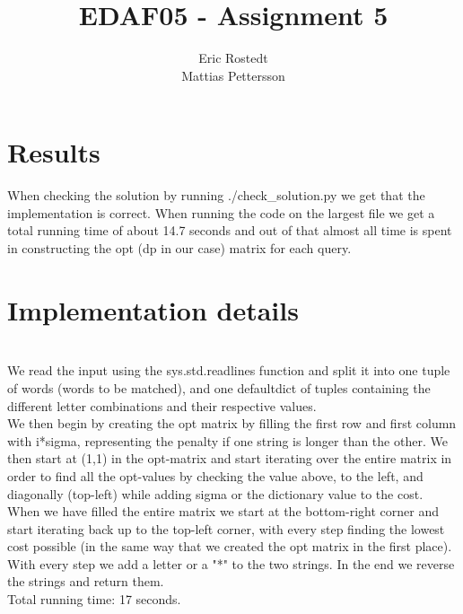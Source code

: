 \documentclass{article}
\title{EDAF05 - Assignment 5}
\author{Eric Rostedt \\ Mattias Pettersson}
\begin{document}
\maketitle

\section{Results}

When checking the solution by running ./check\_solution.py we get that the implementation is correct. When running the code on the largest file we get a total running time of about 14.7 seconds and out of that almost all time is spent in constructing the opt (dp in our case) matrix for each query. 

\section{Implementation details}

\\
We read the input using the sys.std.readlines function and split it into one tuple of words (words to be matched), and one defaultdict of tuples containing the different letter combinations and their respective values.\\

We then begin by creating the opt matrix by filling the first row and first column with i*sigma, representing the penalty if one string is longer than the other. We then start at (1,1) in the opt-matrix and start iterating over the entire matrix in order to find all the opt-values by checking the value above, to the left, and diagonally (top-left) while adding sigma or the dictionary value to the cost.\\

When we have filled the entire matrix we start at the bottom-right corner and start iterating back up to the top-left corner, with every step finding the lowest cost possible (in the same way that we created the opt matrix in the first place). With every step we add a letter or a "*" to the two strings. In the end we reverse the strings and return them.\\

Total running time: 17 seconds.
\end{document}
